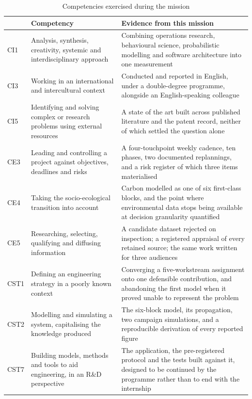 \begin{table}[htbp]
\centering
\caption{Competencies exercised during the mission}
\label{tab:competences}
\footnotesize
\begin{tabularx}{\linewidth}{>{\raggedright\arraybackslash}p{1.0cm} >{\raggedright\arraybackslash}p{4.0cm} X}
\toprule
& \textbf{Competency} & \textbf{Evidence from this mission} \\
\midrule
CI1 & Analysis, synthesis, creativity, systemic and interdisciplinary approach & Combining
operations research, behavioural science, probabilistic modelling and software architecture
into one measurement \\
CI3 & Working in an international and intercultural context & Conducted and reported in
English, under a double-degree programme, alongside an English-speaking colleague \\
CI5 & Identifying and solving complex or research problems using external resources & A
state of the art built across published literature and the patent record, neither of which
settled the question alone \\
CE3 & Leading and controlling a project against objectives, deadlines and risks & A
four-touchpoint weekly cadence, ten phases, two documented replannings, and a risk
register of which three items materialised \\
CE4 & Taking the socio-ecological transition into account & Carbon modelled as one of six
first-class blocks, and the point where environmental data stops being available at decision
granularity quantified \\
CE5 & Researching, selecting, qualifying and diffusing information & A candidate dataset
rejected on inspection; a registered appraisal of every retained source; the same work written
for three audiences \\
CST1 & Defining an engineering strategy in a poorly known context & Converging a
five-workstream assignment onto one defensible contribution, and abandoning the first model
when it proved unable to represent the problem \\
CST2 & Modelling and simulating a system, capitalising the knowledge produced & The six-block
model, its propagation, two campaign simulations, and a reproducible derivation of every
reported figure \\
CST7 & Building models, methods and tools to aid engineering, in an R\&D perspective & The
application, the pre-registered protocol and the tests built against it, designed to be
continued by the programme rather than to end with the internship \\
\bottomrule
\end{tabularx}
\end{table}

